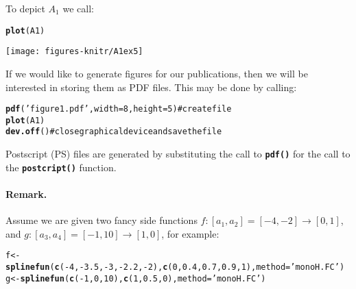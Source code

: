 \documentclass[11pt]{article}\usepackage{graphicx, color}
\makeatletter
\newcommand{\hlfunctioncall}[1]{\textcolor[rgb]{0.501960784313725,0,0.329411764705882}{\textbf{#1}}}%
\newcommand{\hlstring}[1]{\textcolor[rgb]{0.6,0.6,1}{#1}}%
\newcommand{\hlcomment}[1]{\textcolor[rgb]{0.180392156862745,0.6,0.341176470588235}{#1}}%
\newenvironment{kframe}{%
 \def\at@end@of@kframe{}%
 \ifinner\ifhmode%
  \def\at@end@of@kframe{\end{minipage}}%
  \begin{minipage}{\columnwidth}%
 \fi\fi%
 \def\FrameCommand##1{\hskip\@totalleftmargin \hskip-\fboxsep
 \colorbox{shadecolor}{##1}\hskip-\fboxsep
     \hskip-\linewidth \hskip-\@totalleftmargin \hskip\columnwidth}%
 \MakeFramed {\advance\hsize-\width
   \@totalleftmargin\z@ \linewidth\hsize
   \@setminipage}}%
 {\par\unskip\endMakeFramed%
 \at@end@of@kframe}
\newenvironment{knitrout}{}{} %
\newcommand{\func}[1]{\texttt{\hlfunctioncall{#1}}}
\makeatother
\begin{document}
\noindent
To depict $A_1$ we call:

\begin{knitrout}\small
{}\color{fgcolor}\begin{kframe}
\begin{alltt}
\hlfunctioncall{plot}(A1)
\end{alltt}
\end{kframe}
\end{knitrout}


\begin{center}
\begin{knitrout}\small
{}\color{fgcolor}

{\centering \texttt{[image: figures-knitr/A1ex5]} 

}



\end{knitrout}

\end{center}

\noindent
If we would like to generate figures for our publications,
then we will be interested in storing them as PDF files.
This may be done by calling:

\begin{knitrout}\small
{}\color{fgcolor}\begin{kframe}
\begin{alltt}
\hlfunctioncall{pdf}(\hlstring{'figure1.pdf'}, width=8, height=5) \hlcomment{# create file}
\hlfunctioncall{plot}(A1)
\hlfunctioncall{dev.off}() \hlcomment{# close graphical device and save the file}
\end{alltt}
\end{kframe}
\end{knitrout}


\noindent
Postscript (PS) files are generated by substituting the call
to \func{pdf()} for the call to the \func{postcript()} function.





\paragraph{Remark.}
Assume we are given two fancy side functions $f: [a_1,a_2]=[-4,-2]\to[0,1]$,
and $g: [a_3,a_4]=[-1,10]\to[1,0]$,
for example:

\begin{knitrout}\small
{}\color{fgcolor}\begin{kframe}
\begin{alltt}
f <- \hlfunctioncall{splinefun}(\hlfunctioncall{c}(-4,-3.5,-3,-2.2,-2), \hlfunctioncall{c}(0,0.4,0.7,0.9,1), method=\hlstring{'monoH.FC'})
g <- \hlfunctioncall{splinefun}(\hlfunctioncall{c}(-1,0,10), \hlfunctioncall{c}(1,0.5,0), method=\hlstring{'monoH.FC'})
\end{alltt}
\end{kframe}
\end{knitrout}
\end{document}
